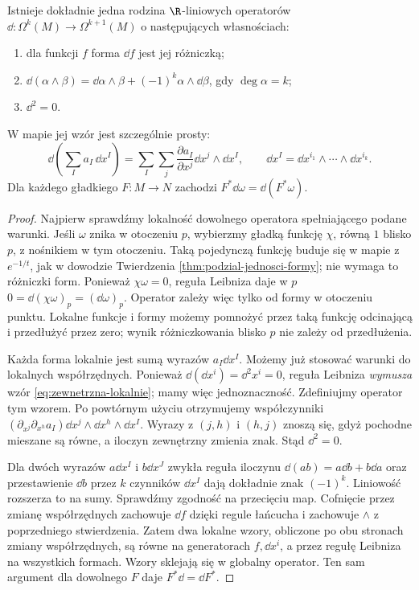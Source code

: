 \begin{twierdzenie}
\label{thm:formy-d}
Istnieje dokładnie jedna rodzina $\R$-liniowych
operatorów $\dd:\Omega^k(M)\to\Omega^{k+1}(M)$
o następujących własnościach:
\begin{enumerate}[leftmargin=*]
\item dla funkcji $f$ forma $\dd f$ jest jej różniczką;
\item $\dd(\alpha\wedge\beta)=\dd\alpha\wedge\beta
 +(-1)^k\alpha\wedge\dd\beta$, gdy $\deg\alpha=k$;
\item $\dd^2=0$.
\end{enumerate}
W mapie jej wzór jest szczególnie prosty:
\begin{equation}\label{eq:zewnetrzna-lokalnie}
 \dd\!\left(\sum_I a_I\,\dd x^I\right)
  =\sum_I\sum_j\frac{\partial a_I}{\partial x^j}
     \dd x^j\wedge\dd x^I,
 \qquad \dd x^I=\dd x^{i_1}\wedge\cdots\wedge\dd x^{i_k}.
\end{equation}
Dla każdego gładkiego $F:M\to N$ zachodzi
$F^*\dd\omega=\dd(F^*\omega)$.
\end{twierdzenie}
\begin{proof}
Najpierw sprawdźmy lokalność dowolnego operatora spełniającego
podane warunki. Jeśli $\omega$ znika w otoczeniu $p$, wybierzmy
gładką funkcję $\chi$, równą $1$ blisko $p$, z nośnikiem
w tym otoczeniu. Taką pojedynczą funkcję buduje się w mapie
z $e^{-1/t}$, jak w dowodzie Twierdzenia
\ref{thm:podzial-jednosci-formy}; nie wymaga to różniczki form.
Ponieważ $\chi\omega=0$, reguła Leibniza daje w $p$
$0=\dd(\chi\omega)_p=(\dd\omega)_p$.
Operator zależy więc tylko od formy w otoczeniu punktu.
Lokalne funkcje i formy możemy pomnożyć przez taką funkcję
odcinającą i przedłużyć przez zero; wynik różniczkowania
blisko $p$ nie zależy od przedłużenia.

Każda forma lokalnie jest sumą wyrazów $a_I\dd x^I$.
Możemy już stosować warunki do lokalnych współrzędnych.
Ponieważ $\dd(\dd x^i)=\dd^2x^i=0$,
reguła Leibniza \emph{wymusza} wzór
\eqref{eq:zewnetrzna-lokalnie}; mamy więc jednoznaczność.
Zdefiniujmy operator tym wzorem. Po powtórnym użyciu
otrzymujemy współczynniki
$(\partial_{x^j}\partial_{x^h}a_I)
\dd x^j\wedge\dd x^h\wedge\dd x^I$.
Wyrazy z $(j,h)$ i $(h,j)$ znoszą się, gdyż pochodne
mieszane są równe, a iloczyn zewnętrzny zmienia znak.
Stąd $\dd^2=0$.

Dla dwóch wyrazów $a\dd x^I$ i $b\dd x^J$
zwykła reguła iloczynu $\dd(ab)=a\dd b+b\dd a$
oraz przestawienie $\dd b$ przez $k$ czynników
$\dd x^I$ dają dokładnie znak $(-1)^k$.
Liniowość rozszerza to na sumy.
Sprawdźmy zgodność na przecięciu map. Cofnięcie przez
zmianę współrzędnych zachowuje $\dd f$ dzięki regule
łańcucha i zachowuje $\wedge$ z poprzedniego
stwierdzenia. Zatem dwa lokalne wzory, obliczone po obu
stronach zmiany współrzędnych, są równe na generatorach
$f,\dd x^i$, a przez regułę Leibniza na wszystkich formach.
Wzory sklejają się w globalny operator. Ten sam argument
dla dowolnego $F$ daje $F^*\dd=\dd F^*$.
\end{proof}

